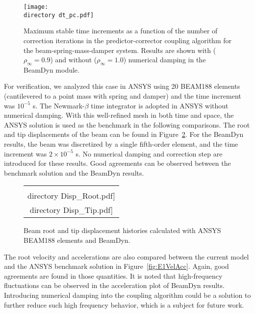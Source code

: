 \documentclass{aiaa-tc}
\def\directory{EPSF/}
\begin{document}
 \begin{figure}
\centering
\texttt{[image: \\directory dt\_pc.pdf]}
\caption{Maximum stable time increments as a function of the number of correction iterations in the predictor-corrector coupling algorithm for the beam-spring-mass-damper system. Results are shown with ($\rho_\infty = 0.9$) and without ($\rho_\infty = 1.0$) numerical damping in the BeamDyn module.
} 
\label{fig:CoupledDTPC}
\end{figure}
 
For verification, we analyzed this case in ANSYS using 20 BEAM188 elements (cantilevered to a point mass with spring and damper) and the time increment was $10^{-5}$ s. The Newmark-$\beta$ time integrator is adopted in ANSYS without numerical damping. 
With this well-refined mesh in both time and space, the ANSYS solution is used as the benchmark in the following comparisons. 
The root and tip displacements of the beam can be found in Figure~\ref{fig:E1Disp}. 
For the BeamDyn results, the beam was discretized by a single fifth-order element, and the time increment was  $2\times10^{-5}$ s. No numerical damping and correction step are introduced for these results.  
Good agreements can be observed between the benchmark solution and the BeamDyn results. 

\begin{figure}
    \centering
    \begin{tabular}{c}
    \subfloat[Root Displacement]{\label{fig:E1DispRoot}\texttt{[image: \\directory  Disp\_Root.pdf]}} \qquad
\subfloat[Tip Displacement]{\label{fig:E1DispTip}\texttt{[image: \\directory  Disp\_Tip.pdf]}}\\
\end{tabular}
\caption{Beam root and tip displacement histories calculated with ANSYS BEAM188 elements and BeamDyn.}
\label{fig:E1Disp}
\end{figure} 

The root velocity and accelerations are also compared between the current model and the ANSYS benchmark solution in Figure~\ref{fig:E1VelAcc}. 
Again, good agreements are found in those quantities. 
It is noted that high-frequency fluctuations can be observed in the acceleration plot of BeamDyn results. 
Introducing numerical damping into the coupling algorithm could be a solution to further reduce such high frequency behavior, which is a subject for future work.
\end{document}
